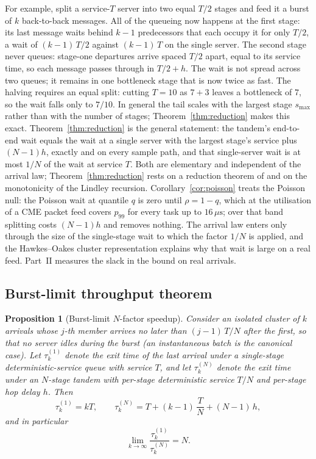 \documentclass[11pt]{article}
\newtheorem{proposition}{Proposition}
\begin{document}
For example, split a service-$T$ server into two equal $T/2$ stages and feed it a burst of
$k$ back-to-back messages. All of the queueing now happens at the first stage: its last
message waits behind $k-1$ predecessors that each occupy it for only $T/2$, a wait of
$(k-1)\,T/2$ against $(k-1)\,T$ on the single server. The second stage never queues: stage-one departures arrive spaced $T/2$ apart, equal to
its service time, so each message passes through in $T/2 + h$. The wait is not spread
across two queues; it remains in one bottleneck stage that is now twice as fast. The
halving requires an equal split: cutting $T = 10$ as $7 + 3$ leaves a bottleneck of $7$,
so the wait falls only to $7/10$. In general the tail scales with the largest stage
$s_{\max}$ rather than with the number of stages; Theorem~\ref{thm:reduction} makes this
exact.
Theorem~\ref{thm:reduction} is the general statement: the tandem's end-to-end wait equals
the wait at a single server with the largest stage's service plus $(N-1)h$, exactly and on
every sample path, and that single-server wait is at most $1/N$ of the wait at service
$T$. Both are elementary and independent of the arrival law; Theorem~\ref{thm:reduction}
rests on a reduction theorem of \citet{friedman1965} and on the monotonicity of the
Lindley recursion. Corollary~\ref{cor:poisson} treats the Poisson null: the Poisson wait
at quantile $q$ is zero until $\rho = 1 - q$, which at the utilisation of a CME packet
feed covers $p_{99}$ for every task up to $16\,\mu\mathrm{s}$; over that band splitting
costs $(N-1)h$ and removes nothing. The arrival law enters only through the size of the
single-stage wait to which the factor $1/N$ is applied, and the Hawkes--Oakes cluster
representation explains why that wait is large on a real feed. Part~II measures the
slack in the bound on real arrivals.

\subsection{Burst-limit throughput theorem}
\label{sec:theory-burst}

\begin{proposition}[Burst-limit $N$-factor speedup]
\label{thm:burst}
Consider an isolated cluster of $k$ arrivals whose $j$-th member arrives no later than
$(j-1)\,T/N$ after the first, so that no server idles during the burst (an instantaneous
batch is the canonical case). Let $\tau_k^{(1)}$ denote the exit time of the last arrival
under a single-stage deterministic-service queue with service $T$, and let $\tau_k^{(N)}$
denote the exit time under an $N$-stage tandem with per-stage deterministic service $T/N$
and per-stage hop delay $h$. Then
\begin{equation}
\tau_k^{(1)} = k T,
\qquad
\tau_k^{(N)} = T + (k - 1)\,\frac{T}{N} + (N - 1)\, h,
\label{eq:burst}
\end{equation}
and in particular
\begin{equation}
\lim_{k \to \infty} \frac{\tau_k^{(1)}}{\tau_k^{(N)}} = N.
\label{eq:burst-limit}
\end{equation}
\end{proposition}
\end{document}
